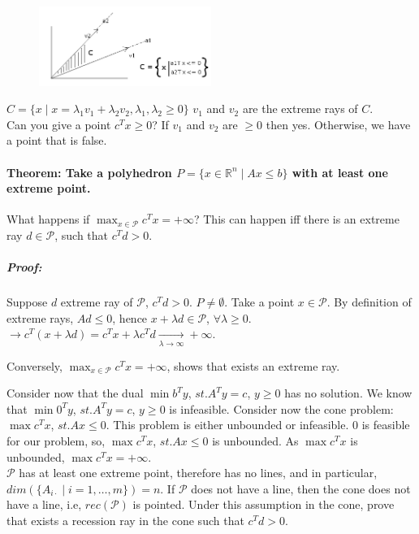 \documentclass[main]{subfiles}
\begin{document}
\begin{figure}[!h]
  \label{fig:cone}
  \centering
    \includegraphics[width=0.5\textwidth]{imgs/cone.png}
\end{figure}

$C = \{x \mid x =\lambda_1 v_1 + \lambda_2 v_2, \lambda_1, \lambda_2 \geq 0 \}$
$v_1$ and $v_2$ are the extreme rays of $C$.\\
Can you give a point $c^T x \geq 0$? If $v_1$ and $v_2$ are $\geq 0$ then yes.
Otherwise, we have a point that is false.

\paragraph{Theorem: Take a polyhedron $P = \{x \in \mathbb{R}^n \mid Ax \leq b
\}$ with at least one extreme point.} What happens if $\displaystyle \max_{x
\in \mathcal{P}} c^{T} x = +\infty$? This can happen iff there is an extreme
ray $d \in \mathcal{P}$, such that $c^T d > 0$.

\subparagraph{Proof:}
Suppose $d$ extreme ray of $\mathcal{P}$, $c^T d > 0$. $P \neq \emptyset$. Take
a point $x \in \mathcal{P}$. By definition of extreme rays, $Ad \leq 0$, hence
$x + \lambda d \in \mathcal{P}$, $\forall \lambda \geq 0$.\\
$\rightarrow c^T(x +\lambda d) = c^T x + \lambda c^T d \xrightarrow[\lambda \to
\infty]{} +\infty$.

Conversely, $\displaystyle \max_{x \in \mathcal{P}} c^{T} x = +\infty$, shows 
that exists an extreme ray.

Consider now that the dual $\min b^T y$, $st. A^T y = c$, $y \geq 0$ has no
solution. We know that $\min 0^T y$, $st. A^T y = c$, $y \geq 0$ is infeasible.
Consider now the cone problem: $\max c^T x$, $st. Ax \leq 0$. This problem is
either unbounded or infeasible. $0$ is feasible for our problem, so,
$\max c^T x$, $st. Ax \leq 0$ is unbounded. As $\max c^T x$ is unbounded,
$\max c^T x = +\infty$.\\

$\mathcal{P}$ has at least one extreme point, therefore has no lines, and in
particular, $dim(\{A_{i\cdot} \mid i = 1, \dots, m\}) = n$. If $\mathcal{P}$
does not have a line, then the cone does not have a line, i.e,
$rec(\mathcal{P})$ is pointed.
Under this assumption in the cone, prove that exists a recession ray in the
cone such that $c^T d > 0$.
\end{document}
